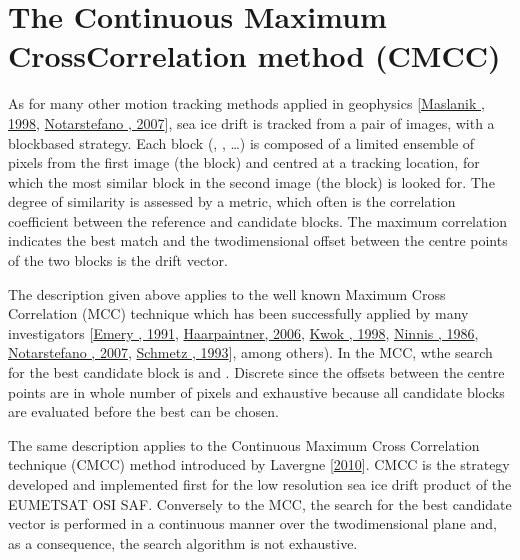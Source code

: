 \documentclass[letterpaper,10pt,english]{jupyterBook}
\begin{document}
\section{The Continuous Maximum Cross\sphinxhyphen{}Correlation method (CMCC)}
\label{\detokenize{background_justification_algorithm:the-continuous-maximum-cross-correlation-method-cmcc}}
\sphinxAtStartPar
As for many other motion tracking methods applied in geophysics
{[}\hyperlink{cite.references:id27}{Maslanik , 1998}, \hyperlink{cite.references:id26}{Notarstefano , 2007}{]}, sea ice
drift is tracked from a pair of images, with a block\sphinxhyphen{}based strategy.
Each block (, , …) is composed of a limited
ensemble of pixels from the first image (the  block) and
centred at a tracking location, for which the most similar block in the
second image (the  block) is looked for. The degree of
similarity is assessed by a metric, which often is the correlation
coefficient between the reference and candidate blocks. The maximum
correlation indicates the best match and the two\sphinxhyphen{}dimensional offset
between the centre points of the two blocks is the drift vector.

\sphinxAtStartPar
The description given above applies to the well known Maximum Cross
Correlation (MCC) technique which has been successfully applied by many
investigators {[}\hyperlink{cite.references:id6}{Emery , 1991}, \hyperlink{cite.references:id9}{Haarpaintner, 2006}, \hyperlink{cite.references:id14}{Kwok , 1998}, \hyperlink{cite.references:id25}{Ninnis , 1986}, \hyperlink{cite.references:id26}{Notarstefano , 2007}, \hyperlink{cite.references:id29}{Schmetz , 1993}{]},
among others). In the MCC, wthe search for the best candidate block is
 and . Discrete since the offsets between the
centre points are in whole number of pixels and exhaustive because all
candidate blocks are evaluated before the best can be chosen.

\sphinxAtStartPar
The same description applies to the Continuous Maximum Cross Correlation technique (CMCC)
method introduced by Lavergne  {[}\hyperlink{cite.references:id19}{2010}{]}. CMCC is the strategy developed and
implemented first for the low resolution sea ice drift product of the EUMETSAT OSI SAF.
Conversely to the MCC, the search for the best candidate vector is
performed in a continuous manner over the two\sphinxhyphen{}dimensional plane and, as
a consequence, the search algorithm is not exhaustive.
\end{document}

